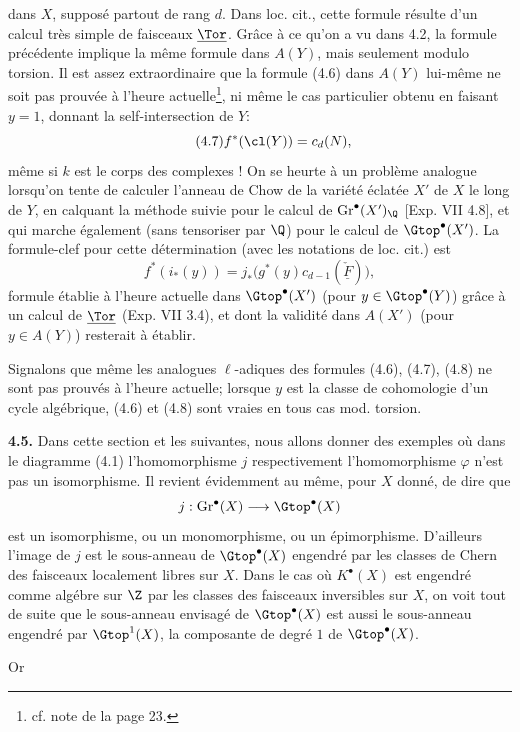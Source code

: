 dans $X$, supposé partout de rang $d$. Dans loc. cit., cette formule résulte d'un calcul très simple de faisceaux $\underline{\Tor}$. Grâce à ce qu'on a vu dans 4.2, la formule précédente implique la même formule dans $A(Y)$, mais seulement modulo torsion. Il est assez extraordinaire que la formule (4.6) dans $A(Y)$ lui-même ne soit pas prouvée à l'heure actuelle\footnote{cf. note de la page 23.}, ni même le cas particulier obtenu en faisant $y=1$, donnant la self-intersection de $Y$:
\begin{equation}\tag{4.7}
 f^*(\cl(Y))=c_d(N),
\end{equation}
même si $k$ est le corps des complexes ! On se heurte à un problème analogue lorsqu'on tente de calculer l'anneau de Chow de la variété éclatée $X'$ de $X$ le long de $Y$, en calquant la méthode suivie pour le calcul de $\operatorname{Gr}^\bullet(X')_\Q$ [Exp. VII 4.8], et qui marche également (sans tensoriser par $\Q$) pour le calcul de $\Gtop^\bullet(X')$. La formule-clef pour cette détermination (avec les notations de loc. cit.) est
\begin{equation}\tag{4.8}
 f^*(i_*(y))=j_*\bigl(g^*(y)c_{d-1}(\check{\underline F})\bigr),
\end{equation}
formule établie à l'heure actuelle dans $\Gtop^\bullet(X')$ (pour $y\in\Gtop^\bullet(Y)$) grâce à un calcul de $\underline{\Tor}$ (Exp. VII 3.4), et dont la validité dans $A(X')$ (pour $y\in A(Y)$) resterait à établir.

Signalons que même les analogues $\ell$-adiques des formules (4.6), (4.7), (4.8) ne sont pas prouvés à l'heure actuelle; lorsque $y$ est la classe de cohomologie d'un cycle algébrique, (4.6) et (4.8) sont vraies en tous cas mod. torsion.

\textbf{4.5.} Dans cette section et les suivantes, nous allons donner des exemples où dans le diagramme (4.1) l'homomorphisme $j$ respectivement l'homomorphisme $\varphi$ n'est pas un isomorphisme. Il revient évidemment au même, pour $X$ donné, de dire que
\[
 j:\operatorname{Gr}^\bullet(X)\longrightarrow \Gtop^\bullet(X)
\]
est un isomorphisme, ou un monomorphisme, ou un épimorphisme. D'ailleurs l'image de $j$ est le sous-anneau de $\Gtop^\bullet(X)$ engendré par les classes de Chern des faisceaux localement libres sur $X$. Dans le cas où $K^\bullet(X)$ est engendré comme algébre sur $\Z$ par les classes des faisceaux inversibles sur $X$, on voit tout de suite que le sous-anneau envisagé de $\Gtop^\bullet(X)$ est aussi le sous-anneau engendré par $\Gtop^1(X)$, la composante de degré $1$ de $\Gtop^\bullet(X)$.

Or
